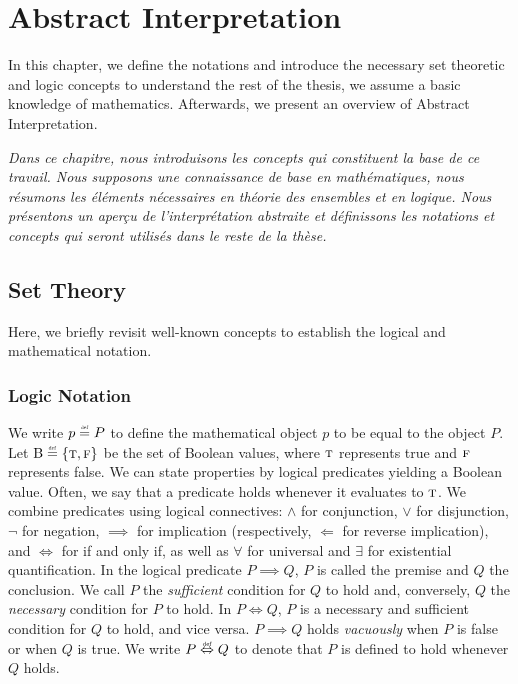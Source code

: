 


\setchapterpreamble[u]{\margintoc}


\chapter{Abstract Interpretation}


\marginemptybox{11.6cm}

In this chapter, we define the notations and introduce the necessary set theoretic and logic concepts to understand the rest of the thesis, we assume a basic knowledge of mathematics.
Afterwards, we present an overview of Abstract Interpretation.

\emph{Dans ce chapitre, nous introduisons les concepts qui constituent la base de ce travail. Nous supposons une connaissance de base en mathématiques, nous résumons les éléments nécessaires en théorie des ensembles et en logique. Nous présentons un aperçu de l'interprétation abstraite et définissons les notations et concepts qui seront utilisés dans le reste de la thèse.}

\section{Set Theory}

Here, we briefly revisit well-known concepts to establish the logical and mathematical notation.

\subsection{Logic Notation}

We write $p \defeq P$ to define the mathematical object $p$ to be equal to the object $P$.
Let $\B \defeq \{\true, \false\}$ be the set of Boolean values, where $\textsc{t}$ represents true and $\textsc{f}$ represents false.
We can state properties by logical predicates yielding a Boolean value.
Often, we say that a predicate holds whenever it evaluates to $\textsc{t}$.
We combine predicates using logical connectives: $\land$ for conjunction, $\lor$ for disjunction, $\neg$ for negation, $\implies$ for implication (respectively, $\Leftarrow$ for reverse implication), and $\iff$ for if and only if, as well as $\forall$ for universal and $\exists$ for existential quantification.
In the logical predicate $P \implies Q$, $P$ is called the premise and $Q$ the conclusion.
We call $P$ the \emph{sufficient} condition for $Q$ to hold and, conversely, $Q$ the \emph{necessary} condition for $P$ to hold.
In $P \iff Q$, $P$ is a necessary and sufficient condition for $Q$ to hold, and vice versa.
$P \implies Q$ holds \emph{vacuously} when $P$ is false or when $Q$ is true.
We write $P \defiff Q$ to denote that $P$ is defined to hold whenever $Q$ holds.


